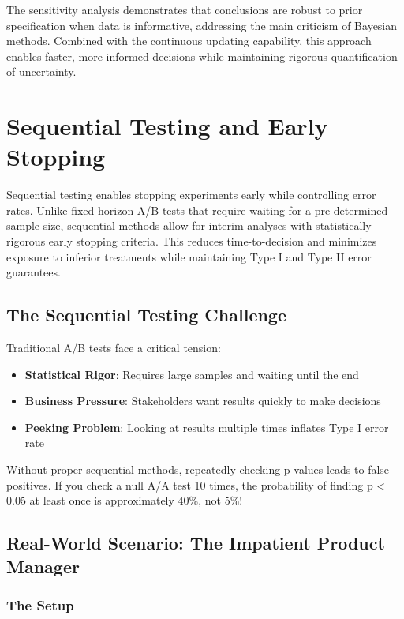 The sensitivity analysis demonstrates that conclusions are robust to prior specification when data is informative, addressing the main criticism of Bayesian methods. Combined with the continuous updating capability, this approach enables faster, more informed decisions while maintaining rigorous quantification of uncertainty.

\section{Sequential Testing and Early Stopping}

Sequential testing enables stopping experiments early while controlling error rates. Unlike fixed-horizon A/B tests that require waiting for a pre-determined sample size, sequential methods allow for interim analyses with statistically rigorous early stopping criteria. This reduces time-to-decision and minimizes exposure to inferior treatments while maintaining Type I and Type II error guarantees.

\subsection{The Sequential Testing Challenge}

Traditional A/B tests face a critical tension:
\begin{itemize}
    \item \textbf{Statistical Rigor}: Requires large samples and waiting until the end
    \item \textbf{Business Pressure}: Stakeholders want results quickly to make decisions
    \item \textbf{Peeking Problem}: Looking at results multiple times inflates Type I error rate
\end{itemize}

Without proper sequential methods, repeatedly checking p-values leads to false positives. If you check a null A/A test 10 times, the probability of finding p < 0.05 at least once is approximately 40\%, not 5\%!

\subsection{Real-World Scenario: The Impatient Product Manager}

\subsubsection{The Setup}

